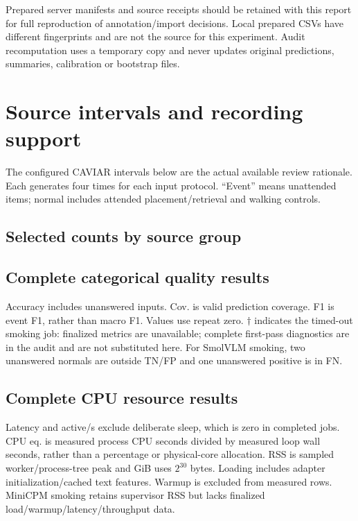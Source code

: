 \documentclass[11pt,a4paper]{article}
\begin{document}
Prepared server manifests and source receipts should be retained with this report for full reproduction of annotation/import decisions. Local prepared CSVs have different fingerprints and are not the source for this experiment. Audit recomputation uses a temporary copy and never updates original predictions, summaries, calibration or bootstrap files.

\section{Source intervals and recording support}
The configured CAVIAR intervals below are the actual available review rationale. Each generates four times for each input protocol. ``Event'' means unattended items; normal includes attended placement/retrieval and walking controls.
\small\normalsize
\subsection{Selected counts by source group}
\small\normalsize

\clearpage\begin{landscape}
\section{Complete categorical quality results}
\small\setlength{\tabcolsep}{4pt}

\normalsize
Accuracy includes unanswered inputs. Cov. is valid prediction coverage. F1 is event F1, rather than macro F1. Values use repeat zero. $\dagger$ indicates the timed-out smoking job: finalized metrics are unavailable; complete first-pass diagnostics are in the audit and are not substituted here. For SmolVLM smoking, two unanswered normals are outside TN/FP and one unanswered positive is in FN.
\end{landscape}

\begin{landscape}
\section{Complete CPU resource results}
\small\setlength{\tabcolsep}{5pt}

\normalsize
Latency and active/s exclude deliberate sleep, which is zero in completed jobs. CPU eq. is measured process CPU seconds divided by measured loop wall seconds, rather than a percentage or physical-core allocation. RSS is sampled worker/process-tree peak and GiB uses $2^{30}$ bytes. Loading includes adapter initialization/cached text features. Warmup is excluded from measured rows. MiniCPM smoking retains supervisor RSS but lacks finalized load/warmup/latency/throughput data.
\end{landscape}
\end{document}
